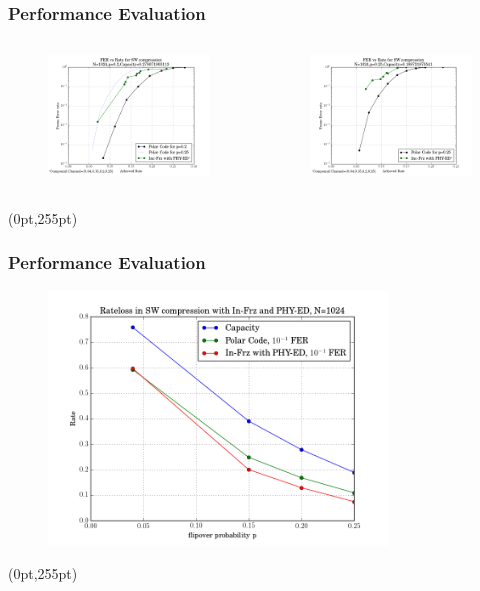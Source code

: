\documentclass[xcolor=dvipsnames]{beamer}
\newcommand\hypercorner[1]{%
  \begin{textblock*}{\paperwidth}(0pt,255pt)
    \raggedleft #1\hspace{.5em}
  \end{textblock*}}
\begin{document}
\begin{frame}[label=psw2]
\frametitle{Performance Evaluation}
\begin{minipage}[1.1\textheight]{\textwidth}
\begin{columns}
\begin{column}{0.5\textwidth}
\begin{figure}
\centering
\includegraphics[width=6cm]{./FERSW_0p2.png}
\end{figure}
\end{column}
\begin{column}{0.5\textwidth}
\begin{figure}
\centering
\includegraphics[width=6cm]{./FERSW_0p25.png}
\end{figure}
\end{column}
\end{columns}
\end{minipage}
\hypercorner{\hyperlink{pch2}{}}
\end{frame}

\begin{frame}[label=psw3]
\frametitle{Performance Evaluation}
\begin{figure}
\centering
\includegraphics[width=9cm]{./ratelosssw.png}
\end{figure}
\hypercorner{\hyperlink{pch3}{}}
\end{frame}
\end{document}
